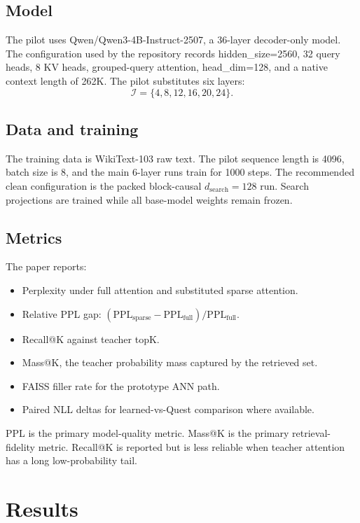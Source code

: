 \documentclass[10pt]{article}
\begin{document}
\subsection{Model}
The pilot uses Qwen/Qwen3-4B-Instruct-2507, a 36-layer decoder-only model. The
configuration used by the repository records hidden\_size=2560, 32 query heads,
8 KV heads, grouped-query attention, head\_dim=128, and a native context length
of 262K. The pilot substitutes six layers:
\begin{equation}
    \mathcal{I}=\{4,8,12,16,20,24\}.
\end{equation}

\subsection{Data and training}
The training data is WikiText-103 raw text. The pilot sequence length is 4096,
batch size is 8, and the main 6-layer runs train for 1000 steps. The
recommended clean configuration is the packed block-causal
$d_{\mathrm{search}}=128$ run. Search projections are trained while all
base-model weights remain frozen.

\subsection{Metrics}
The paper reports:
\begin{itemize}
    \item Perplexity under full attention and substituted sparse attention.
    \item Relative PPL gap:
    $(\mathrm{PPL}_{\mathrm{sparse}}-\mathrm{PPL}_{\mathrm{full}})/
    \mathrm{PPL}_{\mathrm{full}}$.
    \item Recall@K against teacher topK.
    \item Mass@K, the teacher probability mass captured by the retrieved set.
    \item FAISS filler rate for the prototype ANN path.
    \item Paired NLL deltas for learned-vs-Quest comparison where available.
\end{itemize}
PPL is the primary model-quality metric. Mass@K is the primary
retrieval-fidelity metric. Recall@K is reported but is less reliable when
teacher attention has a long low-probability tail.

\section{Results}
\end{document}

